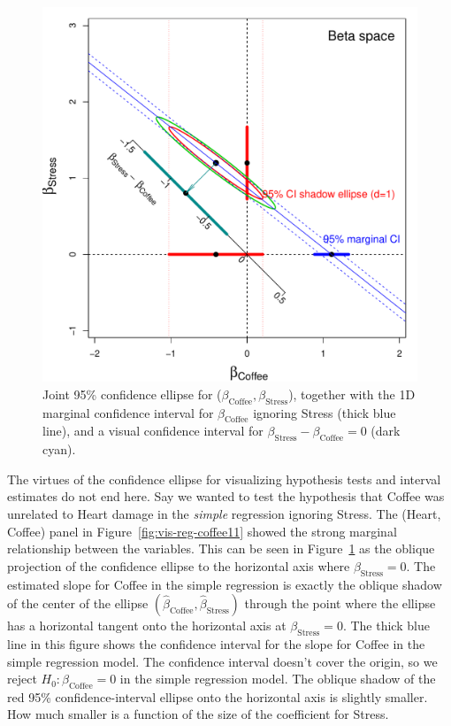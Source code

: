 \documentclass[11pt]{article}%
\newcommand*{\figref}[1]{Figure~\ref{#1}}
\begin{document}
\begin{figure}[htb]
  \centering
  \includegraphics[width=.6\textwidth,clip]{fig/vis-reg-coffee13}
  \caption{Joint 95\% confidence ellipse for ($\beta_{\mathrm{Coffee}}, \beta_{\mathrm{Stress}}$),
  together with the 1D marginal confidence interval for $\beta_{\mathrm{Coffee}}$
  ignoring Stress (thick blue line), and a visual confidence interval for $\beta_{\mathrm{Stress}} - \beta_{\mathrm{Coffee}}=0$
  (dark cyan).
  }%
  \label{fig:vis-reg-coffee13}
\end{figure}

The virtues of the confidence ellipse for visualizing hypothesis tests and interval estimates
do not end here. Say we wanted to test the hypothesis that Coffee was unrelated to Heart damage
in the \emph{simple} regression ignoring Stress.  The (Heart, Coffee) panel in \figref{fig:vis-reg-coffee11}
showed the strong marginal relationship between the variables.  This can be seen in \figref{fig:vis-reg-coffee13} as
the oblique projection of the confidence ellipse to the horizontal axis where $\beta_{\mathrm{Stress}}=0$.
The estimated slope for Coffee in the simple regression is exactly the oblique shadow of
the center of the ellipse $(\widehat{\beta}_{\mathrm{Coffee}}, \widehat{\beta}_{\mathrm{Stress}})$
through the point where the ellipse has a horizontal tangent onto the horizontal axis at
$\beta_{\mathrm{Stress}}=0$. The thick blue line in this figure shows the confidence interval
for the slope for Coffee in the simple regression model. The confidence interval doesn't cover the origin, so
we reject $H_0: \beta_{\mathrm{Coffee}} = 0$ in the simple regression model.
The oblique shadow of the red 95\% confidence-interval ellipse onto the horizontal axis
is slightly smaller.  How much smaller is a function of the size of the coefficient for Stress.
\end{document}
